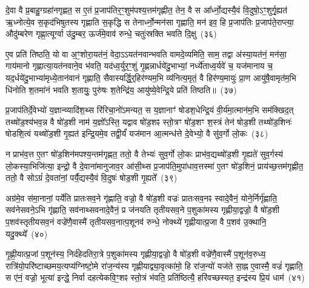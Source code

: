 {\anuvakamend[{द॒भ्नो॒त्यन॑भिषुतस्य गृह्णा॒त्येका॒न्नविꣳ॑श॒तिश्च॑}]}

दे॒वा वै प्र॒बाहु॒ग्ग्रहा॑नगृह्णत॒ स ए॒तं प्र॒जा\-प॑तिर॒ꣳ॒शुम॑पश्य॒त्तम॑गृह्णीत॒ तेन॒ वै स आ᳚र्ध्नो॒द्यस्यै॒वं वि॒दुषो॒\-ऽꣳ॒शुर्गृ॒ह्यत॑ ऋ॒ध्नोत्ये॒व स॒कृद॑भिषुतस्य गृह्णाति स॒कृद्धि स तेनार्ध्नो॒न्मन॑सा गृह्णाति॒ मन॑ इव॒ हि प्र॒जा\-प॑तिः प्र॒जा\-प॑ते॒राप्त्या॒ औदु॑म्बरेण गृह्णा॒त्यूर्ग्वा उ॑दु॒म्बर॒ ऊर्ज॑मे॒वाव॑ रुन्धे॒ चतुः॑स्रक्ति भवति दि॒क्षु~(३६)\ip

ए॒व प्रति॑ तिष्ठति॒ यो वा अ॒ꣳ॒शोरा॒यत॑नं॒ वेदा॒\-ऽऽ\-यत॑नवान्भवति वामदे॒व्यमिति॒ साम॒ तद्वा अ॑स्या॒यत॑नं॒ मन॑सा॒ गाय॑मानो गृह्णात्या॒यत॑नवाने॒व भ॑वति॒ यद॑ध्व॒र्युर॒ꣳ॒शुं गृ॒ह्णन्नार्धये॑दु॒भाभ्यां॒ नर्ध्ये॑ताध्व॒र्यवे॑ च॒ यज॑मानाय च॒ यद॒र्धये॑दु॒भाभ्या॑मृध्ये॒तान॑वानं गृह्णाति॒ सैवास्यर्द्धि॒र्॒\mbox{}हिर॑ण्यम॒भि व्य॑नित्य॒मृतं॒ वै हिर॑ण्य॒मायुः॑ प्रा॒ण आयु॑षै॒वामृत॑म॒भि धि॑नोति श॒तमा॑नं भवति श॒तायुः॒ पुरु॑षः श॒तेन्द्रि॑य॒ आयु॑ष्ये॒वेन्द्रि॒ये प्रति॑ तिष्ठति॥~(३७)\ip

{\anuvakamend[{दि॒क्ष्व॑निति विꣳश॒तिश्च॑}]}%

प्र॒जा\-प॑तिर्दे॒वेभ्यो॑ य॒ज्ञान्व्यादि॑श॒थ्स रि॑रिचा॒नो॑\-ऽमन्यत॒ स य॒ज्ञानाꣳ॑ षोडश॒धेन्द्रि॒यं वी॒र्य॑मा॒त्मान॑म॒भि सम॑क्खिद॒त् तथ्षो॑ड॒श्य॑भव॒न्न वै षो॑ड॒शी नाम॑ य॒ज्ञो᳚\-ऽस्ति॒ यद्वाव षो॑ड॒शꣴ स्तो॒त्रꣳ षो॑ड॒शꣳ श॒स्त्रं तेन॑ षोड॒शी तथ्षो॑ड॒शिनः॑ षोडशि॒त्वं यथ्षो॑ड॒शी गृ॒ह्यत॑ इन्द्रि॒यमे॒व तद्वी॒र्यं॑ यज॑मान आ॒त्मन्ध॑त्ते दे॒वेभ्यो॒ वै सु॑व॒र्गो लो॒कः~(३८)\ip

न प्राभ॑व॒त्त ए॒तꣳ षो॑ड॒शिन॑मपश्य॒न्तम॑गृह्णत॒ ततो॒ वै तेभ्यः॑ सुव॒र्गो लो॒कः प्राभ॑व॒द्यथ्षो॑ड॒शी गृ॒ह्यते॑ सुव॒र्गस्य॑ लो॒कस्या॒भिजि॑त्या॒ इन्द्रो॒ वै दे॒वाना॑मानुजाव॒र आ॑सी॒थ्स प्र॒जा\-प॑ति॒मुपा॑धाव॒त्तस्मा॑ ए॒तꣳ षो॑ड॒शिनं॒ प्राय॑च्छ॒त्तम॑गृह्णीत॒ ततो॒ वै सो\-ऽग्रं॑ दे॒वता॑नां॒ पर्यै॒द्यस्यै॒वं वि॒दुषः॑ षोड॒शी गृ॒ह्यते᳚~(३९)\ip

अग्र॑मे॒व स॑मा॒नानां॒ पर्ये॑ति प्रातःसव॒ने गृ॑ह्णाति॒ वज्रो॒ वै षो॑ड॒शी वज्रः॑ प्रातःसव॒नꣴ स्वादे॒वैनं॒ योने॒र्निर्गृ॑ह्णाति॒ सव॑नेसवने॒\-ऽभि गृ॑ह्णाति॒ सव॑नाथ्सवनादे॒वैनं॒ प्र ज॑नयति तृतीय\-सव॒ने प॒शुका॑मस्य गृह्णीया॒द्वज्रो॒ वै षो॑ड॒शी प॒शव॑स्तृतीय\-सव॒नं वज्रे॑णै॒वास्मै॑ तृतीय\-सव॒नात्प॒शूनव॑ रुन्धे॒ नोक्थ्ये॑ गृह्णीयात्प्र॒जा वै प॒शव॑ उ॒क्थानि॒ यदु॒क्थ्ये᳚~(४०)\ip

गृ॒ह्णी॒यात्प्र॒जां प॒शून॑स्य॒ निर्द॑हेदतिरा॒त्रे प॒शुका॑मस्य गृह्णीया॒द्वज्रो॒ वै षो॑ड॒शी वज्रे॑णै॒वास्मै॑ प॒शून॑व॒रुध्य॒ रात्रि॑यो॒परि॑ष्टाच्छमय॒त्यप्य॑ग्निष्टो॒मे रा॑ज॒न्य॑स्य गृह्णीयाद्व्या॒वृत्का॑मो॒ हि रा॑ज॒न्यो॑ यज॑ते सा॒ह्न ए॒वास्मै॒ वज्रं॑ गृह्णाति॒ स ए॑नं॒ वज्रो॒ भूत्या॑ इन्द्धे॒ निर्वा दहत्येकवि॒ꣳ॒शꣴ स्तो॒त्रं भ॑वति॒ प्रति॑ष्ठित्यै॒ हरि॑वच्छस्यत॒ इन्द्र॑स्य प्रि॒यं धाम॑~(४१)\ip

